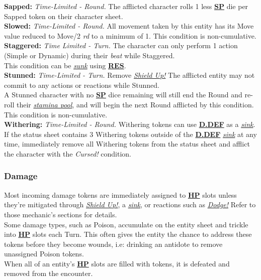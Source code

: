 \documentclass[12pt]{article}
\newcommand{\refto}[1]{\hyperlink{#1}{\textbf{#1}}}
\newcommand{\reftoit}[1]{\hyperlink{#1}{\emph{#1}}}
\begin{document}
\begin{multicols*}{2}
\textbf{Sapped:} \emph{Time-Limited - Round.} The afflicted character rolls 1 less \refto{SP} die per Sapped token on their character sheet.\\

\textbf{Slowed:} \emph{Time-Limited - Round.} All movement taken by this entity has its Move value reduced to Move/2 \emph{rd} to a minimum of 1. This condition is non-cumulative.\\

\textbf{Staggered:} \emph{Time Limited - Turn.} The character can only perform 1 action (Simple or Dynamic) during their \emph{beat} while Staggered.\\
This condition can be \reftoit{sunk} using \refto{RES}.\\

\textbf{Stunned:} \emph{Time-Limited - Turn.} Remove \reftoit{Shield Up!} The afflicted entity may not commit to any actions or reactions while Stunned.\\
A Stunned character with no \refto{SP} dice remaining will still end the Round and re-roll their \reftoit{stamina pool}, and will begin the next Round afflicted by this condition.\\
This condition is non-cumulative.\\

\textbf{Withering:} \emph{Time-Limited - Round.} Withering tokens can use \refto{D.DEF} as a \reftoit{sink}. If the status sheet contains 3 Withering tokens outside of the \refto{D.DEF} \reftoit{sink} at any time, immediately remove all Withering tokens from the status sheet and afflict the character with the \emph{Cursed!} condition.

\subsubsection{Damage}
Most incoming damage tokens are immediately assigned to \refto{HP} slots unless they’re mitigated through \reftoit{Shield Up!}, a \reftoit{sink}, or reactions such as \reftoit{Dodge!} Refer to those mechanic’s sections for details.\\
Some damage types, such as Poison, accumulate on the entity sheet and trickle into \refto{HP} slots each Turn. This often gives the entity the chance to address these tokens before they become wounds, i.e: drinking an antidote to remove unassigned Poison tokens.\\
When all of an entity’s \refto{HP} slots are filled with tokens, it is defeated and removed from the encounter.


\end{multicols*}
\end{document}
